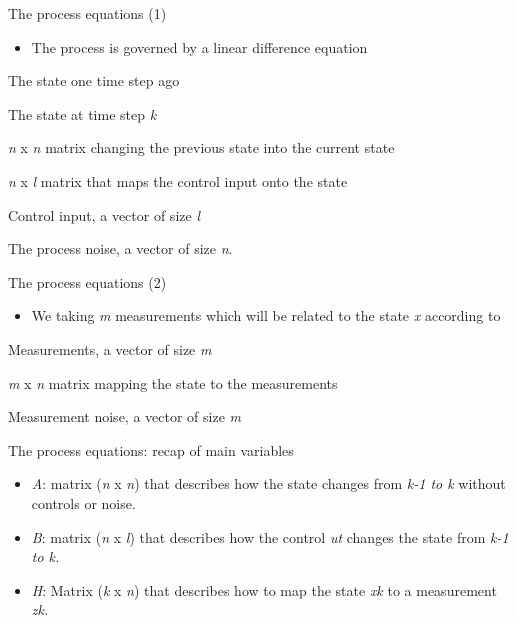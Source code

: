 \documentclass[compress]{beamer}
\providecommand{\tightlist}{%
  \setlength{\itemsep}{0pt}\setlength{\parskip}{0pt}}
\begin{document}
\begin{frame}{The process equations (1)}

\begin{itemize}
\tightlist
\item
  The process is governed by a linear difference equation
\end{itemize}

The state one time step ago

The state at time step \emph{k}

\emph{n} x \emph{n} matrix changing the previous state into the current
state

\emph{n} x \emph{l} matrix that maps the control input onto the state

Control input, a vector of size \emph{l}

The process noise, a vector of size \emph{n}.

\end{frame}

\begin{frame}{The process equations (2)}

\begin{itemize}
\tightlist
\item
  We taking \emph{m} measurements which will be related to the state
  \emph{x} according to
\end{itemize}

Measurements, a vector of size \emph{m}

\emph{m} x \emph{n} matrix mapping the state to the measurements

Measurement noise, a vector of size \emph{m}

\end{frame}

\begin{frame}{The process equations: recap of main variables}

\begin{itemize}
\tightlist
\item
  \emph{A}: matrix (\emph{n} x \emph{n}) that describes how the state
  changes from \emph{k-1 to k} without controls or noise.
\item
  \emph{B}: \emph{} matrix (\emph{n} x \emph{l}) that describes how the
  control \emph{ut} changes the state from \emph{k-1 to k.}
\item
  \emph{H}: Matrix (\emph{k} x \emph{n}) that describes how to map the
  state \emph{xk} to a measurement \emph{zk.}
\end{itemize}

\end{frame}
\end{document}
